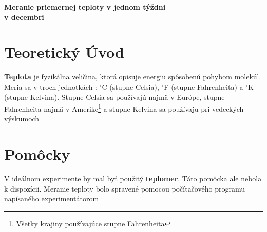 \documentclass{article}
\begin{document}
\begin{center} 
	\huge \textbf{Meranie priemernej teploty v jednom týždni \\ v decembri} 
\end{center}
\normalsize
\vskip 5cm
\section{Teoretický Úvod}
\textbf{Teplota} je fyzikálna veličina, ktorá opisuje energiu spôsobenú pohybom molekúl.
Meria sa v troch jednotkách : $^{\circ}$C (stupne Celsia), $^{\circ}$F (stupne Fahrenheita) a $^{\circ}$K (stupne Kelvina). Stupne Celsia sa používajú najmä v Európe, stupne Fahrenheita najmä v Amerike\footnote{\href{https://worldpopulationreview.com/country-rankings/countries-that-use-fahrenheit}{Všetky krajiny používajúce stupne Fahrenheita}} a stupne Kelvina sa používaju pri vedeckých výskumoch
\section{Pomôcky}
V ideálnom experimente by mal byť použitý \textbf{teplomer}.
Táto pomôcka ale nebola k dispozícii.
Meranie teploty bolo spravené pomocou počítačového programu napísaného experimentátorom
\end{document}
